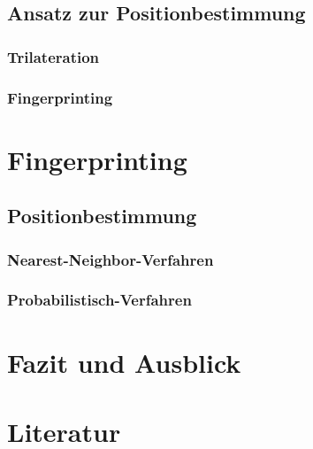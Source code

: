 \documentclass[liststotoc,a4paper, 12pt]{scrartcl}
\begin{document}
\subsection{Ansatz zur Positionbestimmung}
\subsubsection{Trilateration}
\subsubsection{Fingerprinting}

\section{Fingerprinting}
\subsection{Positionbestimmung}
\subsubsection{Nearest-Neighbor-Verfahren}
\subsubsection{Probabilistisch-Verfahren}

\section{Fazit und Ausblick}

\section{Literatur}
\end{document}
